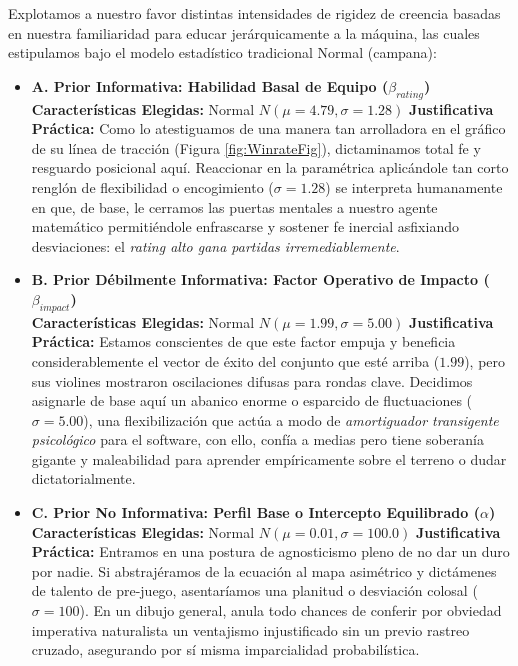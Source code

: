 \documentclass[twocolumn,10pt]{article}
\begin{document}
Explotamos a nuestro favor distintas intensidades de rigidez de creencia basadas en nuestra familiaridad para educar jerárquicamente a la máquina, las cuales estipulamos bajo el modelo estadístico tradicional Normal (campana):

\begin{itemize}
    \item \textbf{A. Prior Informativa: Habilidad Basal de Equipo ($\beta_{rating}$)}\\
    \textbf{Características Elegidas:} Normal $N(\mu = 4.79, \sigma = 1.28)$\newline
    \textbf{Justificativa Práctica:} Como lo atestiguamos de una manera tan arrolladora en el gráfico de su línea de tracción (Figura \ref{fig:WinrateFig}), dictaminamos total fe y resguardo posicional aquí. Reaccionar en la paramétrica aplicándole tan corto renglón de flexibilidad o encogimiento ($\sigma = 1.28$) se interpreta humanamente en que, de base, le cerramos las puertas mentales a nuestro agente matemático permitiéndole enfrascarse y sostener fe inercial asfixiando desviaciones: el \textit{rating alto gana partidas irremediablemente}.
    
    \item \textbf{B. Prior Débilmente Informativa: Factor Operativo de Impacto ($\beta_{impact}$)}\\
    \textbf{Características Elegidas:} Normal $N(\mu = 1.99, \sigma = 5.00)$\newline
    \textbf{Justificativa Práctica:} Estamos conscientes de que este factor empuja y beneficia considerablemente el vector de éxito del conjunto que esté arriba ($1.99$), pero sus violines mostraron oscilaciones difusas para rondas clave. Decidimos asignarle de base aquí un abanico enorme o esparcido de fluctuaciones ($\sigma = 5.00$), una flexibilización que actúa a modo de \textit{amortiguador transigente psicológico} para el software, con ello, confía a medias pero tiene soberanía gigante y maleabilidad para aprender empíricamente sobre el terreno o dudar dictatorialmente.
    
    \item \textbf{C. Prior No Informativa: Perfil Base o Intercepto Equilibrado ($\alpha$)}\\
    \textbf{Características Elegidas:} Normal $N(\mu = 0.01, \sigma = 100.0)$\newline
    \textbf{Justificativa Práctica:} Entramos en una postura de agnosticismo pleno de no dar un duro por nadie. Si abstrajéramos de la ecuación al mapa asimétrico y dictámenes de talento de pre-juego, asentaríamos una planitud o desviación colosal ($\sigma = 100$). En un dibujo general, anula todo chances de conferir por obviedad imperativa naturalista un ventajismo injustificado sin un previo rastreo cruzado, asegurando por sí misma imparcialidad probabilística.
\end{itemize}
\end{document}
